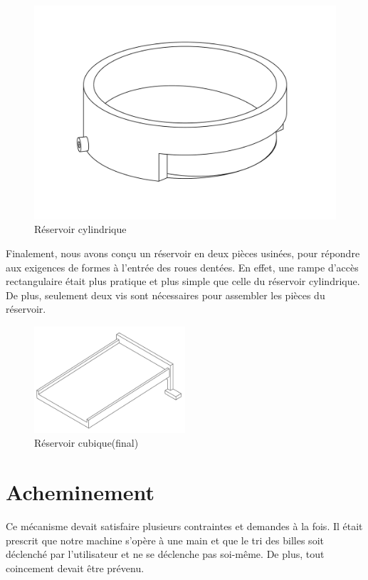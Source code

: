 \begin{figure}
    \centering
    \includegraphics[width=\textwidth]{Graphics/Reservoir_initial/RESERVOIR_CYLINDRIQUE.pdf}
    \caption{Réservoir cylindrique}
\end{figure}

Finalement, nous avons conçu un réservoir en deux pièces usinées, pour répondre aux exigences de formes à l'entrée des roues dentées. En effet, une rampe d'accès rectangulaire était plus pratique et plus simple que celle du réservoir cylindrique. De plus, seulement deux vis sont nécessaires pour assembler les pièces du réservoir. 
\begin{figure}
    \centering
    \includegraphics[width=0.5\textwidth]{Graphics/Reservoir_initial/RESERVOIR_CUBE.pdf}
    \caption{Réservoir cubique(final)}
\end{figure}

\section{Acheminement}
Ce mécanisme devait satisfaire plusieurs contraintes et demandes à la fois. Il était prescrit que notre machine s'opère à une main et que le tri des billes soit déclenché par l'utilisateur et ne se déclenche pas soi-même. De plus, tout coincement devait être prévenu.


